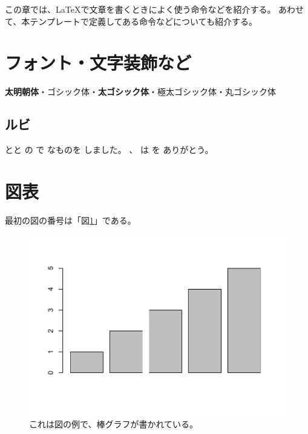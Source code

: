 \documentclass[ %
	uplatex,%
	a5paper,%
	papersize%
	]{jsbook}
\begin{document}
						\begin{summary}
							この章では、\LaTeX で文章を書くときによく使う命令などを紹介する。
							あわせて、本テンプレートで定義してある命令などについても紹介する。
						\end{summary}

						\section{フォント・文字装飾など}
						{\mcfamily\bfseries 太明朝体}・{\gtfamily ゴシック体}・{\gtfamily\bfseries 太ゴシック体}・{\gtfamily\ebseries 極太ゴシック体}・{\mgfamily 丸ゴシック体} 



						\subsection{ルビ}
						とと
						の
						で
						なものを
						しました。
						、
						は
						を
						ありがとう。


						\section{図表}
						最初の図の番号は「図\ref{fg:figure-example}」である。

						\begin{figure}[h]
							\centering
							\includegraphics[width=0.8\hsize]{barplot01.pdf}
							\caption{これは図の例で、棒グラフが書かれている。}
							\label{fg:figure-example}
						\end{figure}
\end{document}
